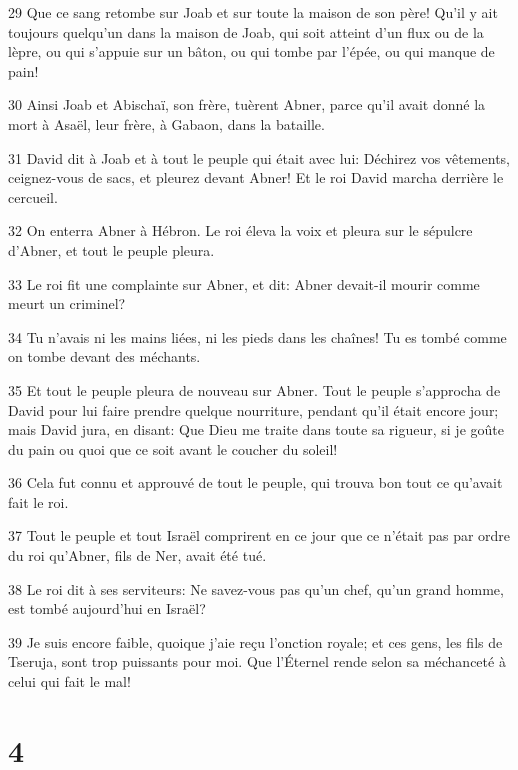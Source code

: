 \par 29 Que ce sang retombe sur Joab et sur toute la maison de son père! Qu'il y ait toujours quelqu'un dans la maison de Joab, qui soit atteint d'un flux ou de la lèpre, ou qui s'appuie sur un bâton, ou qui tombe par l'épée, ou qui manque de pain!
\par 30 Ainsi Joab et Abischaï, son frère, tuèrent Abner, parce qu'il avait donné la mort à Asaël, leur frère, à Gabaon, dans la bataille.
\par 31 David dit à Joab et à tout le peuple qui était avec lui: Déchirez vos vêtements, ceignez-vous de sacs, et pleurez devant Abner! Et le roi David marcha derrière le cercueil.
\par 32 On enterra Abner à Hébron. Le roi éleva la voix et pleura sur le sépulcre d'Abner, et tout le peuple pleura.
\par 33 Le roi fit une complainte sur Abner, et dit: Abner devait-il mourir comme meurt un criminel?
\par 34 Tu n'avais ni les mains liées, ni les pieds dans les chaînes! Tu es tombé comme on tombe devant des méchants.
\par 35 Et tout le peuple pleura de nouveau sur Abner. Tout le peuple s'approcha de David pour lui faire prendre quelque nourriture, pendant qu'il était encore jour; mais David jura, en disant: Que Dieu me traite dans toute sa rigueur, si je goûte du pain ou quoi que ce soit avant le coucher du soleil!
\par 36 Cela fut connu et approuvé de tout le peuple, qui trouva bon tout ce qu'avait fait le roi.
\par 37 Tout le peuple et tout Israël comprirent en ce jour que ce n'était pas par ordre du roi qu'Abner, fils de Ner, avait été tué.
\par 38 Le roi dit à ses serviteurs: Ne savez-vous pas qu'un chef, qu'un grand homme, est tombé aujourd'hui en Israël?
\par 39 Je suis encore faible, quoique j'aie reçu l'onction royale; et ces gens, les fils de Tseruja, sont trop puissants pour moi. Que l'Éternel rende selon sa méchanceté à celui qui fait le mal!

\chapter{4}


